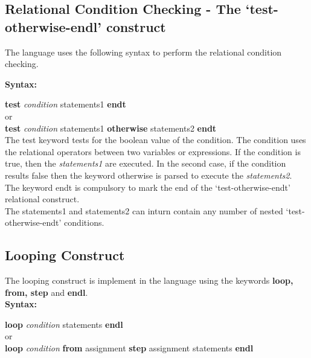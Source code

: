 \documentclass[12pt, oneside, a4paper]{article}
\begin{document}
\subsection{Relational Condition Checking - The `test-otherwise-endl' construct}
The language uses the following syntax to perform the relational condition checking.

\hspace{.25in} \textbf{Syntax:}

\hspace{.5in}  \textbf{test} \emph{condition} statements1 \textbf{endt}\\

\hspace{.5in}  or\\

\hspace{.5in}  \textbf{test} \emph{condition} statements1 \textbf{otherwise} statements2 \textbf{endt}\\

The test keyword tests for the boolean value of the condition.  The condition uses the relational operators between two variables or expressions.  If the condition is true, then the \emph{statements1} are executed.  In the second case, if the condition results false then the keyword otherwise is parsed to execute the \emph{statements2}.  The keyword endt is compulsory to mark the end of the `test-otherwise-endt' relational construct.\\

The statements1 and statements2 can inturn contain any number of nested `test-otherwise-endt' conditions.

\subsection{Looping Construct}
The looping construct is implement in the language using the keywords \textbf{loop, from, step} and \textbf{endl}.\\

\hspace{.25in} \textbf{Syntax:}

\hspace{.5in}  \textbf{loop} \emph{condition} statements \textbf{endl}\\

\hspace{.5in}  or\\

\hspace{.5in}  \textbf{loop} \emph{condition} \textbf{from} assignment \textbf{step} assignment statements \textbf{endl}\\
\end{document}
